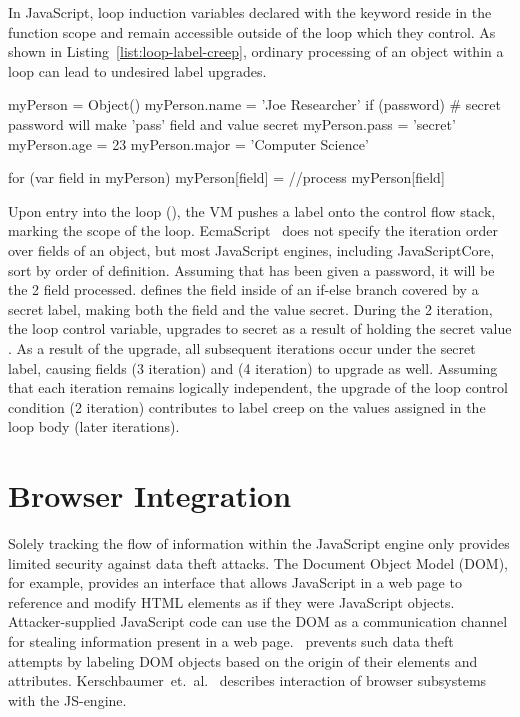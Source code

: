 In JavaScript, loop induction variables declared with the  keyword reside in the function scope and remain accessible outside of the loop which they control.
As shown in Listing~\ref{list:loop-label-creep}, ordinary processing of an object within a loop can lead to undesired label upgrades.

\begin{jscode}
myPerson = Object()
myPerson.name = 'Joe Researcher'
if (password) {
  # secret password will make 'pass' field and value secret
  myPerson.pass = 'secret'
}
myPerson.age = 23
myPerson.major = 'Computer Science'

for (var field in myPerson) {
    myPerson[field] = //process myPerson[field]
}
\end{jscode}

Upon entry into the loop (), the VM pushes a label onto the control flow stack, marking the scope of the loop.
EcmaScript~\cite{ecma} does not specify the iteration order over fields of an object, but most JavaScript engines, including JavaScriptCore, sort by order of definition.
Assuming that  has been given a password, it will be the 2 field processed.
 defines the  field inside of an if-else branch covered by a secret label, making both the field and the value secret.
During the 2 iteration, the loop control variable,  upgrades to secret as a result of holding the secret value .
As a result of the upgrade, all subsequent iterations occur under the secret label, causing fields  (3 iteration) and  (4 iteration) to upgrade as well.
Assuming that each iteration remains logically independent, the upgrade of the loop control condition (2 iteration) contributes to label creep on the values assigned in the loop body (later iterations).

\section{Browser Integration}

Solely tracking the flow of information within the JavaScript engine only provides limited security against data theft attacks.
The Document Object Model (DOM), for example, provides an interface that allows JavaScript in a web page to reference and modify HTML elements as if they were JavaScript objects.
Attacker-supplied JavaScript code can use the DOM as a communication channel for stealing information present in a web page.
\JitFlow\ prevents such data theft attempts by labeling DOM objects based on the origin of their elements and attributes.
Kerschbaumer~et.~al.~\cite{kerschbaumer.etal+13} describes interaction of browser subsystems with the JS-engine.
